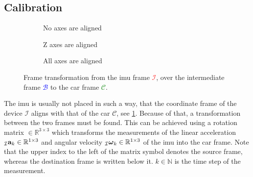 \subsection{Calibration}
\label{ssec:calibration_imu}
\begin{figure}[htb]
    \centering
    \begin{subfigure}[b]{0.3\textwidth}
        \centering
        
        \caption{No axes are aligned}
        \label{fig:tikz_frame_transformation_init}
    \end{subfigure}
    \hfill
    \begin{subfigure}[b]{0.3\textwidth}
        \centering
        
        \caption{Z axes are aligned}
        \label{fig:tikz_frame_transformation_intermediate}
    \end{subfigure}
    \hfill
    \begin{subfigure}[b]{0.3\textwidth}
        \centering
        
        \caption{All axes are aligned}
        \label{fig:tikz_frame_transformation_final}
    \end{subfigure}
    \caption[Frame transformation]{Frame transformation from the \acrshort{imu} frame \textcolor{red}{$\mathcal{I}$}, over the intermediate frame \textcolor{blue}{$\mathcal{B}$} to the car frame \textcolor{green}{$\mathcal{C}$}.}
    \label{fig:tikz_frame_transformation}
\end{figure}
The \gls{imu} is usually not placed in such a way, that the coordinate frame of the device $\mathcal{I}$ aligns with that of the car $\mathcal{C}$, see \cref{fig:tikz_frame_transformation_init}.
Because of that, a transformation between the two frames must be found.
This can be achieved using a rotation matrix  $\in \mathbb{R}^{3\times3}$ which transforms the measurements of the linear acceleration $\vincs{a}{I}_k \in \mathbb{R}^{1\times3}$ and angular velocity ${\vincs{\boldsymbol{\omega}}{I}_k \in \mathbb{R}^{1\times3}}$ of the \gls{imu} into the car frame.
Note that the upper index to the left of the matrix symbol denotes the source frame, whereas the destination frame is written below it.
$k \in \mathbb{N}$ is the time step of the measurement.

